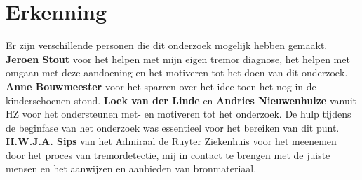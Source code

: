 \section*{Erkenning}
Er zijn verschillende personen die dit onderzoek mogelijk hebben gemaakt.
\textbf{Jeroen Stout} voor het helpen met mijn eigen tremor diagnose, 
het helpen met omgaan met deze aandoening en het motiveren tot het doen van dit onderzoek.
\textbf{Anne Bouwmeester} voor het sparren over het idee toen het nog in de kinderschoenen stond.
\textbf{Loek van der Linde} en \textbf{Andries Nieuwenhuize} vanuit HZ voor het ondersteunen met- en motiveren tot het onderzoek.
De hulp tijdens de beginfase van het onderzoek was essentieel voor het bereiken van dit punt.
\textbf{H.W.J.A. Sips} van het Admiraal de Ruyter Ziekenhuis voor het meenemen door het proces van tremordetectie,
mij in contact te brengen met de juiste mensen en het aanwijzen en aanbieden van bronmateriaal.